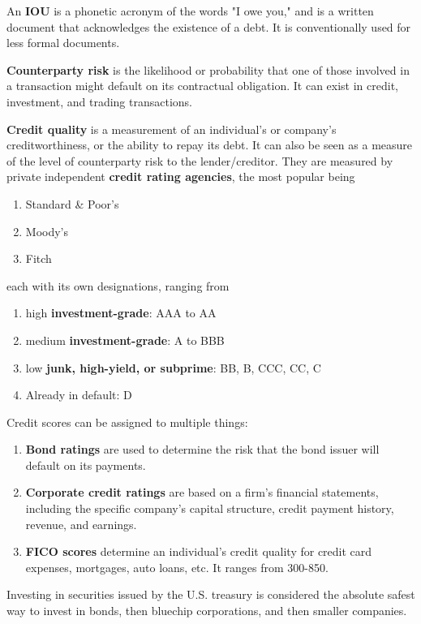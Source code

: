 \documentclass{article}
\begin{document}
  \begin{definition}[IOU]
    An \textbf{IOU} is a phonetic acronym of the words "I owe you," and is a written document that acknowledges the existence of a debt. It is conventionally used for less formal documents. 
  \end{definition}

  \begin{definition}
    \textbf{Counterparty risk} is the likelihood or probability that one of those involved in a transaction might default on its contractual obligation. It can exist in credit, investment, and trading transactions. 
  \end{definition}

  \begin{definition}
    \textbf{Credit quality} is a measurement of an individual's or company's creditworthiness, or the ability to repay its debt. It can also be seen as a measure of the level of counterparty risk to the lender/creditor. They are measured by private independent \textbf{credit rating agencies}, the most popular being
    \begin{enumerate}
      \item Standard \& Poor's 
      \item Moody's 
      \item Fitch
    \end{enumerate}
    each with its own designations, ranging from 
    \begin{enumerate}
      \item high \textbf{investment-grade}: AAA to AA
      \item medium \textbf{investment-grade}: A to BBB
      \item low \textbf{junk, high-yield, or subprime}: BB, B, CCC, CC, C
      \item Already in default: D 
    \end{enumerate}
    Credit scores can be assigned to multiple things:
    \begin{enumerate}
      \item \textbf{Bond ratings} are used to determine the risk that the bond issuer will default on its payments. 
      \item \textbf{Corporate credit ratings} are based on a firm's financial statements, including the specific company's capital structure, credit payment history, revenue, and earnings.
      \item \textbf{FICO scores} determine an individual's credit quality for credit card expenses, mortgages, auto loans, etc. It ranges from 300-850. 
    \end{enumerate}
    Investing in securities issued by the U.S. treasury is considered the absolute safest way to invest in bonds, then bluechip corporations, and then smaller companies. 
  \end{definition}
\end{document}
